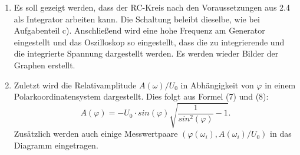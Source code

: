 \begin{enumerate}
       \item Es soll gezeigt werden, dass der RC-Kreis nach den Voraussetzungen aus 2.4 als
       Integrator arbeiten kann. Die Schaltung beleibt dieselbe, wie bei Aufgabenteil c).
       Anschließend wird eine hohe Frequenz am Generator eingestellt und das Oszilloskop so eingestellt, dass
       die zu integrierende und die integrierte Spannung dargestellt werden. Es werden wieder
       Bilder der Graphen erstellt.

       \item Zuletzt wird die Relativamplitude $A(\omega) / U_0$ in Abhängigkeit von $\varphi$ in einem Polarkoordinatensystem dargestellt.
       Dies folgt aus Formel (7) und (8):
       \begin{equation}
         A(\varphi) = -U_0\cdot sin(\varphi)\sqrt{\frac{1}{sin^2(\varphi)}-1}\text{.}
       \end{equation}
       Zusätzlich werden auch einige Messwertpaare $(\varphi(\omega_i), A(\omega_i)/U_0)$ in das Diagramm
        eingetragen.

\end{enumerate}

